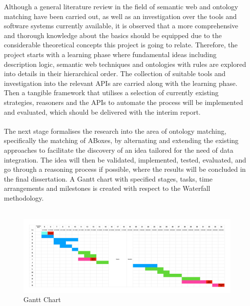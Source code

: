 \documentclass[a4paper,12pt,twoside]{article}
\begin{document}
Although a general literature review in the field of semantic web and ontology matching have been carried out, as well as an investigation over the tools and software systems currently available, it is observed that a more comprehensive and thorough knowledge about the basics should be equipped due to the considerable theoretical concepts this project is going to relate. Therefore, the project starts with a learning phase where fundamental ideas including description logic, semantic web techniques and ontologies with rules are explored into details in their hierarchical order. The collection of suitable tools and investigation into the relevant APIs are carried along with the learning phase. Then a tangible framework that utilises a selection of currently existing strategies, reasoners and the APIs to automate the process will be implemented and evaluated, which should be delivered with the interim report.
\\\\
The next stage formalises the research into the area of ontology matching, specifically the matching of ABoxes, by alternating and extending the existing approaches to facilitate the discovery of an idea tailored for the need of data integration. The idea will then be validated, implemented, tested, evaluated, and go through a reasoning process if possible, where the results will be concluded in the final dissertation. A Gantt chart with specified stages, tasks, time arrangements and milestones is created with respect to the Waterfall methodology.
\\\\

\begin{figure}[htbp]
\includegraphics[width=\textwidth]{img/Gantt.pdf}
\caption{Gantt Chart}
\label{fig:1}
\end{figure}
\end{document}
